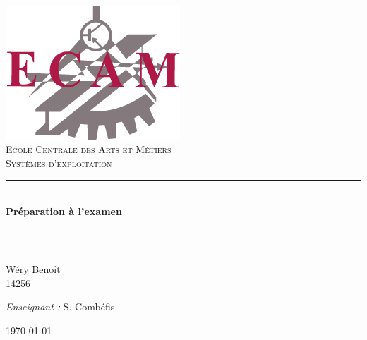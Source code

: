 \setlength{\parindent}{0cm}
\setlength{\parskip}{1ex plus 0.5ex minus 0.2ex}
\newcommand{\hsp}{\hspace{20pt}}
\newcommand{\HRule}{\rule{\linewidth}{0.5mm}}

\begin{titlepage}
  \begin{sffamily}
  \begin{center}

	\hsp\\[2cm]
	\includegraphics[scale=0.3]{images/ecam-logo.png}~\\[1.5cm]
   \textsc{\LARGE Ecole Centrale des Arts et Métiers}\\[2.5cm]

    \textsc{\Large Systèmes  d'exploitation}\\[2cm]
%
    \HRule \\[0.4cm]
    { \huge \bfseries Préparation à l'examen\\[0.4cm] }

    \HRule \\[6cm]

    \begin{minipage}{0.4\textwidth}
      \begin{flushleft} \large
        Wéry Benoît\\
        14256\\
      \end{flushleft}
    \end{minipage}
    \begin{minipage}{0.4\textwidth}
      \begin{flushright} \large
        \textit{Enseignant :} S. Combéfis \\
      \end{flushright}
    \end{minipage}

    \vfill
%
    {\today}

  \end{center}
  \end{sffamily}
\end{titlepage}
